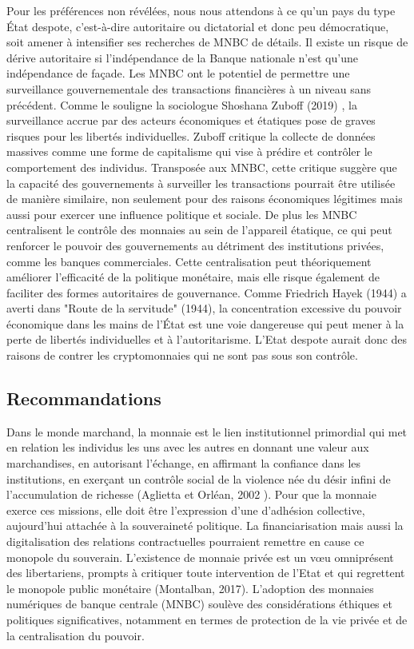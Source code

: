 \documentclass[12pt]{article}
\begin{document}
Pour les préférences non révélées, nous nous attendons à ce qu'un pays du type État despote, c'est-à-dire autoritaire ou dictatorial et donc peu démocratique, soit amener à intensifier ses recherches de MNBC de détails. Il existe un risque de dérive autoritaire si l'indépendance de la Banque nationale n'est qu'une indépendance de façade. Les MNBC ont le potentiel de permettre une surveillance gouvernementale des transactions financières à un niveau sans précédent. Comme le souligne la sociologue Shoshana Zuboff (2019) \cite{hongladarom_shoshana_2020}, la surveillance accrue par des acteurs économiques et étatiques pose de graves risques pour les libertés individuelles. Zuboff critique la collecte de données massives comme une forme de capitalisme qui vise à prédire et contrôler le comportement des individus. Transposée aux MNBC, cette critique suggère que la capacité des gouvernements à surveiller les transactions pourrait être utilisée de manière similaire, non seulement pour des raisons économiques légitimes mais aussi pour exercer une influence politique et sociale. De plus les MNBC centralisent le contrôle des monnaies au sein de l'appareil étatique, ce qui peut renforcer le pouvoir des gouvernements au détriment des institutions privées, comme les banques commerciales. Cette centralisation peut théoriquement améliorer l'efficacité de la politique monétaire, mais elle risque également de faciliter des formes autoritaires de gouvernance. Comme Friedrich Hayek (1944) a averti dans "Route de la servitude" (1944), la concentration excessive du pouvoir économique dans les mains de l'État est une voie dangereuse qui peut mener à la perte de libertés individuelles et à l'autoritarisme. L'Etat despote aurait donc des raisons de contrer les cryptomonnaies qui ne sont pas sous son contrôle.


\subsection{Recommandations}

Dans le monde marchand, la monnaie est le lien institutionnel primordial qui met en relation les individus les uns avec les autres en donnant une valeur aux marchandises, en autorisant l’échange, en affirmant la confiance dans les institutions, en exerçant un contrôle social de la violence née du désir infini de l’accumulation de richesse (Aglietta et Orléan, 2002 \cite{aglietta2002monnaie}). Pour que la monnaie exerce ces missions, elle doit être l’expression d’une d’adhésion collective, aujourd’hui attachée à la souveraineté politique. La financiarisation mais aussi la digitalisation des relations contractuelles pourraient remettre en cause ce monopole du souverain. L’existence de monnaie privée est un vœu omniprésent des libertariens, prompts à critiquer toute intervention de l’Etat et qui regrettent le monopole public monétaire (Montalban, 2017). L'adoption des monnaies numériques de banque centrale (MNBC) soulève des considérations éthiques et politiques significatives, notamment en termes de protection de la vie privée et de la centralisation du pouvoir. \\
\end{document}
